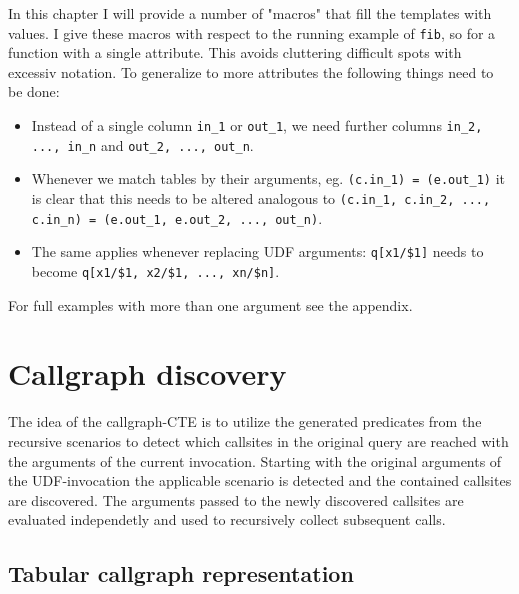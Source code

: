 In this chapter I will provide a number of "macros" that fill the templates with values. I give these macros with respect to the running example of \texttt{fib}, so for a function with a single attribute. This avoids cluttering difficult spots with excessiv notation. To generalize to more attributes the following things need to be done:
\begin{itemize}
    \item Instead of a single column \texttt{in\_1} or \texttt{out\_1}, we need further columns \texttt{in\_2, ..., in\_n} and \texttt{out\_2, ..., out\_n}.
    \item Whenever we match tables by their arguments, eg. \texttt{(c.in\_1) = (e.out\_1)} it is clear that this needs to be altered analogous to \texttt{(c.in\_1, c.in\_2, ..., c.in\_n) = (e.out\_1, e.out\_2, ..., out\_n)}.
    \item The same applies whenever replacing UDF arguments: \texttt{q[x1/\$1]} needs to become \texttt{q[x1/\$1, x2/\$1, ..., xn/\$n]}.
\end{itemize}
For full examples with more than one argument see the appendix. 

\section{Callgraph discovery}

The idea of the callgraph-CTE is to utilize the generated predicates from the recursive scenarios to detect which callsites in the original query are reached with the arguments of the current invocation.
Starting with the original arguments of the UDF-invocation the applicable scenario is detected and the contained callsites are discovered. The arguments passed to the newly discovered callsites are evaluated independetly and used to recursively collect subsequent calls.

\subsection{Tabular callgraph representation}

